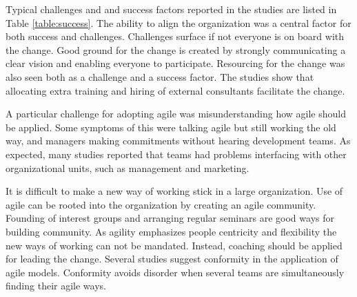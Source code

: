 \documentclass[lnbip]{svmultln}
\begin{document}
Typical challenges and and success factors reported in the studies are listed in
Table \ref{table:success}. The ability to align the organization was a central
factor for both success and challenges. Challenges surface if not everyone is on
board with the change. Good ground for the change is created by strongly
communicating a clear vision and enabling everyone to participate. Resourcing
for the change was also seen both as a challenge and a success factor.
The studies show that allocating extra training and hiring of external
consultants facilitate the change.

A particular challenge for adopting agile was misunderstanding how agile should
be applied. Some symptoms of this were talking agile but still working the old
way, and managers making commitments without hearing development teams.
As expected, many studies reported that teams had problems interfacing with
other organizational units, such as management and marketing.

It is difficult to make a new way of working stick in a large organization.
Use of agile can be rooted into the organization by creating an agile community.
Founding of interest groups and arranging regular seminars are good ways for
building community. As agility emphasizes people centricity and flexibility the
new ways of working can not be mandated. Instead, coaching should be applied for
leading the change. Several studies suggest conformity in the application of
agile models. Conformity avoids disorder when several teams are simultaneously
finding their agile ways.
\end{document}
